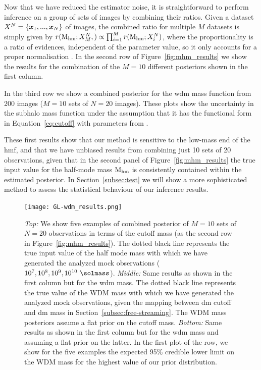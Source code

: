 Now that we have reduced the estimator noise, it is straightforward to perform inference on a group of sets of images by combining their ratios. Given a dataset $X^N=\{\bm{x}_1, ..., \bm{x}_N\}$ of images, the combined ratio for multiple $M$ datasets is simply given by $r(\mathrm{M_{hm}};X^N_M,) \propto \prod_{i=1}^M r(\mathrm{M_{hm}}; X^N_i)$, where the proportionality is a ratio of evidences, independent of the parameter value, so it only accounts for a proper normalisation \citep{Brehmer:2019jyt, Hermans:2019ioj}.
In the second row of Figure~\ref{fig:mhm_results} we show the results for the combination of the $M=10$ different posteriors shown in the first column.

In the third row we show a combined posterior for the \gls*{wdm} mass function from 200 images ($M=10$ sets of $N=20$ images). These plots show the uncertainty in the subhalo mass function under the assumption that it has the functional form in Equation~\eqref{eq:cutoff} with parameters from \cite{Lovell:2020bcy}.

These first results show that our method is sensitive to the low-mass end of the \gls*{hmf}, and that we have unbiased results from combining just 10 sets of 20 observations, given that in the second panel of Figure~\ref{fig:mhm_results} the true input value for the half-mode mass $\mathrm{M_{hm}}$ is consistently contained within the estimated posterior. In Section~\ref{subsec:test} we will show a more sophisticated method to assess the statistical behaviour of
our inference results.

\begin{figure}
\centering
\texttt{[image: GL-wdm\_results.png]}
\caption{\textit{Top:} We show five examples of combined posterior of $M=10$ sets of $N=20$ observations in terms of the cutoff mass (as the second row in Figure~\ref{fig:mhm_results}). The dotted black line represents the true input value of the half mode mass with which we have generated the analyzed mock observations ($10^7, 10^8, 10^9,  10^{10} \ \si{\solmass}$). 
\textit{Middle:} Same results as shown in the first column but for the \gls*{wdm} mass. The dotted black line represents the true value of the WDM mass with which we have generated the analyzed mock observations, given the mapping between \gls*{dm} cutoff and \gls*{dm} mass in Section~\ref{subsec:free-streaming}. The WDM mass posteriors assume a flat prior on the cutoff mass.
\textit{Bottom:} Same results as shown in the first column but for the \gls*{wdm} mass and assuming a flat prior on the latter. In the first plot of the row, we show for the five examples the expected 95\% credible lower limit on the WDM mass for the highest value of our prior distribution. 
}
\label{fig:wdm_results}
\end{figure}

